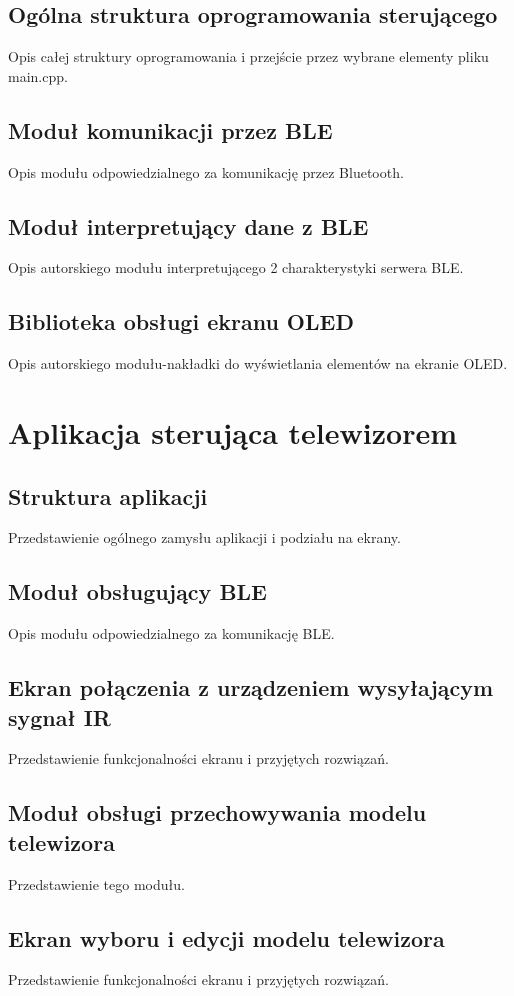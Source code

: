 \documentclass[12pt,twoside]{article}
\begin{document}
\subsection{Ogólna struktura oprogramowania sterującego}
Opis całej struktury oprogramowania i przejście przez wybrane elementy pliku main.cpp.
\subsection{Moduł komunikacji przez BLE}
Opis modułu odpowiedzialnego za komunikację przez Bluetooth.
\subsection{Moduł interpretujący dane z BLE}
Opis autorskiego modułu interpretującego 2 charakterystyki serwera BLE.

\subsection{Biblioteka obsługi ekranu OLED}
Opis autorskiego modułu-nakładki do wyświetlania elementów na ekranie OLED.
\clearpage

\section{Aplikacja sterująca telewizorem}
\subsection{Struktura aplikacji}
Przedstawienie ogólnego zamysłu aplikacji i podziału na ekrany.
\subsection{Moduł obsługujący BLE}
Opis modułu odpowiedzialnego za komunikację BLE.
\subsection{Ekran połączenia z urządzeniem wysyłającym sygnał IR}
Przedstawienie funkcjonalności ekranu i przyjętych rozwiązań.
\subsection{Moduł obsługi przechowywania modelu telewizora}
Przedstawienie tego modułu.
\subsection{Ekran wyboru i edycji modelu telewizora}
Przedstawienie funkcjonalności ekranu i przyjętych rozwiązań.
\end{document}
